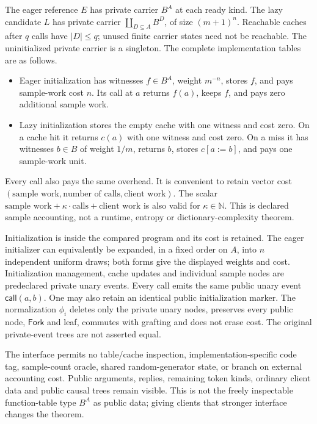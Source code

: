 \documentclass[11pt,a4paper]{article}
\theoremstyle{definition}
\begin{document}
The eager reference $E$ has private carrier $B^A$ at each ready kind.
The lazy candidate $L$ has private carrier
$\coprod_{D\subseteq A}B^D$, of size $(m+1)^n$. Reachable caches after
$q$ calls have $|D|\leq q$; unused finite carrier states need not be
reachable. The uninitialized private carrier is a singleton. The complete
implementation tables are as follows.
\begin{itemize}
\item Eager initialization has witnesses $f\in B^A$, weight $m^{-n}$,
  stores $f$, and pays sample-work cost $n$. Its call at $a$ returns
  $f(a)$, keeps $f$, and pays zero additional sample work.
\item Lazy initialization stores the empty cache with one witness and
  cost zero. On a cache hit it returns $c(a)$ with one witness and cost
  zero. On a miss it has witnesses $b\in B$ of weight $1/m$, returns
  $b$, stores $c[a:=b]$, and pays one sample-work unit.
\end{itemize}
Every call also pays the same overhead. It is convenient to retain vector
cost $(\text{sample work},\text{number of calls},\text{client work})$.
The scalar $\text{sample work}+\kappa\cdot\text{calls}+\text{client
work}$ is also valid for $\kappa\in\mathbb N$. This is declared sample
accounting, not a runtime, entropy or dictionary-complexity theorem.

Initialization is inside the compared program and its cost is retained.
The eager initializer can equivalently be expanded, in a fixed order on
$A$, into $n$ independent uniform draws; both forms give the displayed
weights and cost. Initialization management, cache updates and individual
sample nodes are predeclared private unary events. Every call emits the
same public unary event $\mathsf{call}(a,b)$. One may also retain an
identical public initialization marker. The normalization $\phi_i$
deletes only the private unary nodes, preserves every public node,
$\mathsf{Fork}$ and leaf, commutes with grafting and does not erase cost.
The original private-event trees are not asserted equal.

The interface permits no table/cache inspection, implementation-specific
code tag, sample-count oracle, shared random-generator state, or branch
on external accounting cost. Public arguments, replies, remaining token
kinds, ordinary client data and public causal trees remain visible.
This is not the freely inspectable function-table type $B^A$ as public
data; giving clients that stronger interface changes the theorem.
\end{document}
